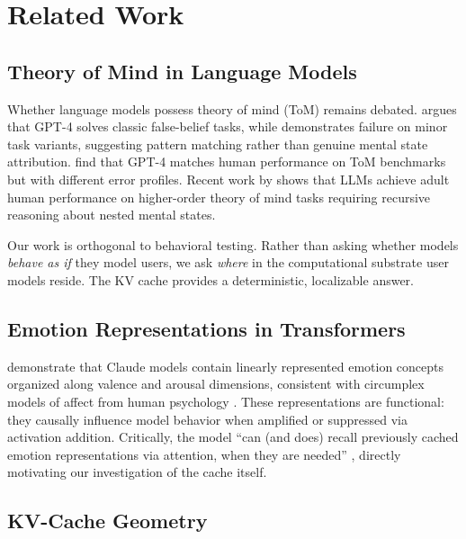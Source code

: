 \documentclass[11pt,a4paper]{article}
\begin{document}
\section{Related Work}

\subsection{Theory of Mind in Language Models}

Whether language models possess theory of mind (ToM) remains debated. \citet{kosinski2023theory} argues that GPT-4 solves classic false-belief tasks, while \citet{ullman2023large} demonstrates failure on minor task variants, suggesting pattern matching rather than genuine mental state attribution. \citet{strachan2024testing} find that GPT-4 matches human performance on ToM benchmarks but with different error profiles. Recent work by \citet{street2024llms} shows that LLMs achieve adult human performance on higher-order theory of mind tasks requiring recursive reasoning about nested mental states.

Our work is orthogonal to behavioral testing. Rather than asking whether models \emph{behave as if} they model users, we ask \emph{where} in the computational substrate user models reside. The KV cache provides a deterministic, localizable answer.

\subsection{Emotion Representations in Transformers}

\citet{anthropic2026emotions} demonstrate that Claude models contain linearly represented emotion concepts organized along valence and arousal dimensions, consistent with circumplex models of affect from human psychology \citep{russell1980circumplex}. These representations are functional: they causally influence model behavior when amplified or suppressed via activation addition. Critically, the model ``can (and does) recall previously cached emotion representations via attention, when they are needed'' \citep{anthropic2026emotions}, directly motivating our investigation of the cache itself.

\subsection{KV-Cache Geometry}
\end{document}
